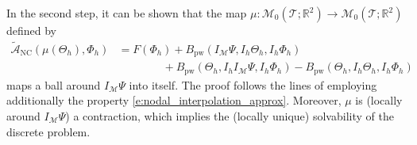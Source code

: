 \documentclass[a4paper]{amsart}
\theoremstyle{definition}
\numberwithin{equation}{section}
\numberwithin{theorem}{section}
\newcommand{\R}{\mathbb{R}}
\newcommand{\pw}{\mathrm{pw}}
\newcommand{\nc}{\mathrm{NC}}
\newcommand{\tri}{\mathcal{T}}
\begin{document}
In the second step, it can be shown that the map 
$\mu:\mathcal{M}_0(\tri;\R^2)\to\mathcal{M}_0(\tri;\R^2)$
defined by 
\begin{align*}
    \tilde{\mathcal{A}}_\nc(\mu(\Theta_h),\Phi_h)
    &= F(\Phi_h) + B_\pw(I_\mathcal{M}\Psi,I_h\Theta_h,I_h\Phi_h)\\
    &\qquad\qquad 
      + B_\pw(\Theta_h,I_hI_\mathcal{M}\Psi,I_h\Phi_h)
      - B_\pw(\Theta_h,I_h\Theta_h,I_h\Phi_h)
\end{align*}
maps a ball around $I_\mathcal{M}\Psi$ into itself.
The proof follows the lines of \cite[Theorem~4.2]{MallikNataraj2016} 
employing additionally the property 
\eqref{e:nodal_interpolation_approx}.
Moreover, $\mu$ is (locally around $I_\mathcal{M}\Psi$)
a contraction, which implies the (locally unique)
solvability of the discrete problem.




\end{document}
